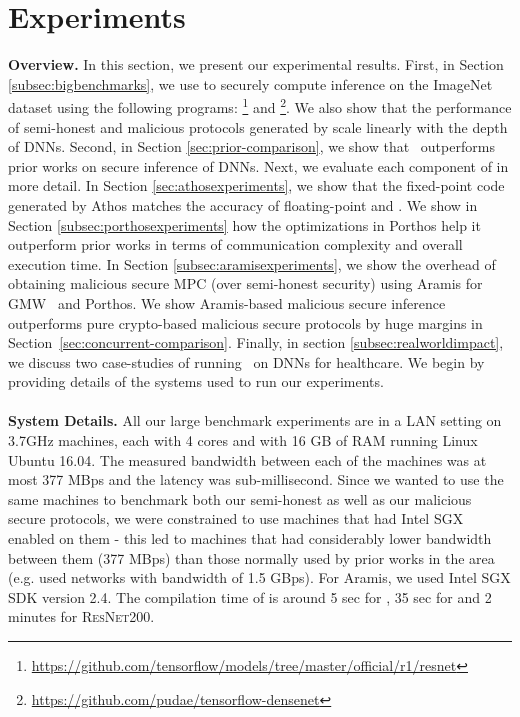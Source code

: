 \section{Experiments}\label{sec:experiments}

\noindent\textbf{Overview.} In this section, we present our experimental results. First, in Section \ref{subsec:bigbenchmarks}, we use \tool to securely compute inference on the ImageNet dataset using the following \tensorflow programs: \resnet\footnote{\url{https://github.com/tensorflow/models/tree/master/official/r1/resnet}} and \densenet\footnote{\url{https://github.com/pudae/tensorflow-densenet}}. 
We also show that the performance of semi-honest and malicious protocols generated by \tool scale linearly with the depth of DNNs.
 Second, in Section \ref{sec:prior-comparison}, we show that \cryptflow\ outperforms prior works on secure inference of DNNs. 
 Next, we evaluate each component of \tool in more detail. 
In Section \ref{sec:athosexperiments}, we show that the fixed-point code generated by Athos matches the accuracy of floating-point  \resnet and \densenet.  We show in Section \ref{subsec:porthosexperiments} how the optimizations in Porthos help it outperform prior works in terms of communication complexity and overall execution time. In Section \ref{subsec:aramisexperiments}, we show the overhead of obtaining malicious secure MPC (over semi-honest security) using Aramis for GMW~\cite{gmw} and Porthos.  
We show Aramis-based malicious secure inference outperforms pure crypto-based  malicious secure protocols by huge margins in Section~\ref{sec:concurrent-comparison}.
Finally, in section \ref{subsec:realworldimpact}, we discuss two case-studies of running \cryptflow\ on DNNs for healthcare.
 We begin by providing details of the systems used to run our experiments.
\\\\
\noindent\textbf{System Details.} All our large benchmark experiments are in a LAN setting on 3.7GHz machines, each with 4 cores and with 16 GB of RAM running Linux Ubuntu 16.04. The measured bandwidth between each of the machines was at most 377 MBps and the latency was sub-millisecond. 
Since we wanted to use the same machines to benchmark both our semi-honest as well as our malicious secure protocols, we were constrained to use machines that had Intel SGX enabled on them - this led to machines that had considerably lower bandwidth between them (377 MBps) than those normally used by prior works in the area (e.g. \cite{aby3, quantizednn} used networks with bandwidth of 1.5 GBps). For Aramis, we used Intel SGX SDK version 2.4.
The compilation time of \tool is around 5 sec for \resnet, 35 sec for \densenet and 2 minutes for {{\textsc{ResNet200}}\xspace}.


